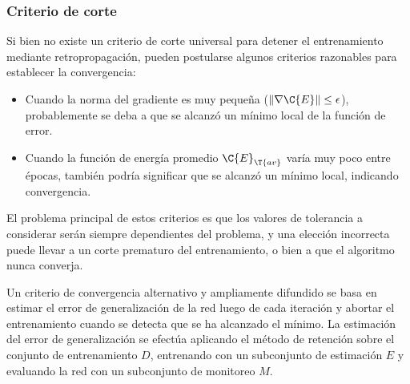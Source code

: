 %
\subsubsection{Criterio de corte}
%
Si bien no existe un criterio de corte universal para detener el
entrenamiento mediante retropropagación, pueden postularse algunos
criterios razonables para establecer la convergencia:
%
\begin{itemize}
\item Cuando la norma del gradiente es muy pequeña
  ($\|\nabla\C{E}\|\leq\epsilon$), probablemente se deba a que se
  alcanzó un mínimo local de la función de error.
\item Cuando la función de energía promedio $\C{E}_{\T{av}}$ varía muy
  poco entre épocas, también podría significar que se alcanzó un
  mínimo local, indicando convergencia.
\end{itemize}
%
El problema principal de estos criterios es que los valores de
tolerancia a considerar serán siempre dependientes del problema, y una
elección incorrecta puede llevar a un corte prematuro del
entrenamiento, o bien a que el algoritmo nunca converja.

Un criterio de convergencia alternativo y ampliamente difundido se
basa en estimar el error de generalización de la red luego de cada
iteración y abortar el entrenamiento cuando se detecta que se ha
alcanzado el mínimo.
La estimación del error de generalización se efectúa aplicando el
método de retención sobre el conjunto de entrenamiento $D$, entrenando
con un subconjunto de estimación $E$ y evaluando la red con un
subconjunto de monitoreo $M$.
